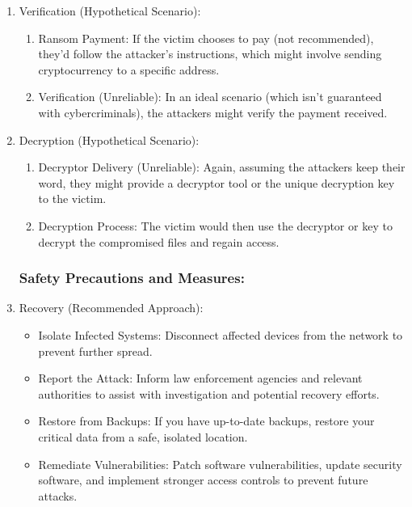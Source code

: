 \documentclass[12pt,letterpaper]{article}
\begin{document}
\begin{enumerate}[label=\arabic*.]
            \item Verification (Hypothetical Scenario):
    
                \begin{enumerate}[label=\alph*.]
                    \item Ransom Payment: If the victim chooses to pay (not recommended), they'd follow the attacker's instructions, which might involve sending cryptocurrency to a specific address.
        
                    \item Verification (Unreliable): In an ideal scenario (which isn't guaranteed with cybercriminals), the attackers might verify the payment received.
                \end{enumerate}
            
            \item Decryption (Hypothetical Scenario):
    
                \begin{enumerate}[label=\alph*.]
                    \item Decryptor Delivery (Unreliable): Again, assuming the attackers keep their word, they might provide a decryptor tool or the unique decryption key to the victim.
    
                    \item Decryption Process: The victim would then use the decryptor or key to decrypt the compromised files and regain access.
                \end{enumerate}
    
        \subsubsection{Safety Precautions and Measures:}
            \item Recovery (Recommended Approach):
                \begin{itemize}
                    \item Isolate Infected Systems: Disconnect affected devices from the network to prevent further spread.
    
                    \item Report the Attack: Inform law enforcement agencies and relevant authorities to assist with investigation and potential recovery efforts.
    
                    \item Restore from Backups: If you have up-to-date backups, restore your critical data from a safe, isolated location.
        
                    \item Remediate Vulnerabilities: Patch software vulnerabilities, update security software, and implement stronger access controls to prevent future attacks.
        
            \end{itemize}
        
        \end{enumerate}
\end{document}
